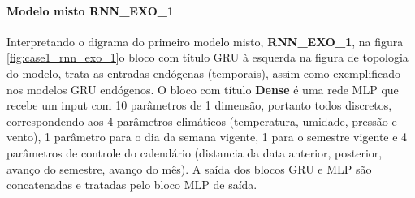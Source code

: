         \paragraph{Modelo misto RNN\_EXO\_1}
            Interpretando o digrama do primeiro modelo misto,  \textbf{RNN\_EXO\_1}, na figura \ref{fig:case1_rnn_exo_1}o bloco com título GRU à esquerda na figura de topologia do modelo, trata as entradas endógenas (temporais), assim como exemplificado nos modelos GRU endógenos. O bloco com título \textbf{Dense} é uma rede MLP que recebe um input com 10 parâmetros de 1 dimensão, portanto todos discretos, correspondendo aos 4 parâmetros climáticos (temperatura, umidade, pressão e vento), 1 parâmetro para o dia da semana vigente, 1 para o semestre vigente e 4 parâmetros de controle do calendário (distancia da data anterior, posterior, avanço do semestre, avanço do mês). A saída dos blocos GRU e MLP são concatenadas e tratadas pelo bloco MLP de saída.
            \begin{figure}[H]
            \end{figure}
            

